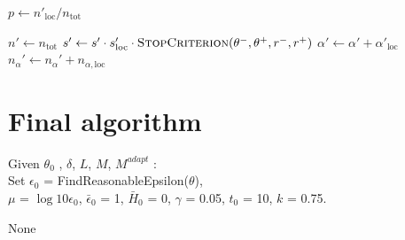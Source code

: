 \documentclass[a4paper,12pt]{article}
\newcommand{\BlueComment}[1]{\tcp{\textcolor{CommentBlue}{#1}}}
\begin{document}
\begin{algorithm}[H]
{		%
		$p \leftarrow n'_{\text{loc}} / n_{\text{tot}}$\;
		
		$n' \leftarrow n_{\text{tot}}$\;
		$s' \leftarrow s' \cdot s'_{\text{loc}} \cdot 
		\textsc{StopCriterion}(\theta^-, \theta^+, r^-, r^+)$\;
		$\alpha' \leftarrow \alpha' + \alpha'_{\text{loc}}$\;
		$n_\alpha' \leftarrow n_\alpha' + n_{\alpha,\text{loc}}$\;
	}
	
	\;
	
\end{algorithm}


\section{Final algorithm}	


	\begin{algorithm}[H]
		\caption{No-U-Turn Sampler with Dual Averaging}
		Given $\theta_0$ , $\delta$, $L$, $M$, $M^{adapt}$ : \\
		\BlueComment{FindReasonableEpsilon($\theta$, key) $\rightarrow$ epsilon}
		Set $\epsilon_0$ = FindReasonableEpsilon($\theta$),\\ 
		 $\mu$ = $\log{10\epsilon_0}$, $\bar{\epsilon}_0$ = 1, $\bar{H}_0$ = 0, $\gamma$ = 0.05, $t_0$ = 10, $k$ = 0.75.
		 
		
		
		
		\Return None
	\end{algorithm}
	
\end{document}
